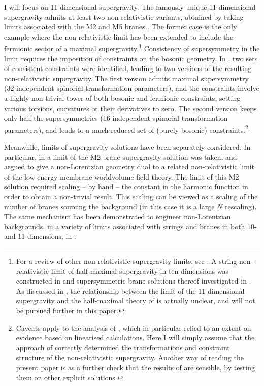 \documentclass[11pt]{article}
\numberwithin{equation}{section}
\begin{document}
I will focus on 11-dimensional supergravity.
The famously unique 11-dimensional supergravity admits at least two non-relativistic variants, obtained by taking limits associated with the M2 
\cite{Blair:2021waq, Bergshoeff:2024nin} and M5 branes \cite{Bergshoeff:2025grj}.
The former case is the only example where the non-relativistic limit has been extended to include the fermionic sector of a maximal supergravity.\footnote{For a review of other non-relativistic supergravity limits, see \cite{Bergshoeff:2022iyb}. 
A string non-relativistic limit of half-maximal supergravity in ten dimensions was constructed in \cite{Bergshoeff:2021tfn} and supersymmetric brane solutions thereof investigated in \cite{Bergshoeff:2022pzk}.
As discussed in \cite{Bergshoeff:2025grj}, the relationship between the limit of the 11-dimensional supergravity and the half-maximal theory of \cite{Bergshoeff:2021tfn} is actually unclear, and will not be pursued further in this paper.
}
Consistency of supersymmetry in the limit requires the imposition of constraints on the bosonic geometry.
In \cite{Bergshoeff:2024nin}, two sets of consistent constraints were identified, leading to two versions of the resulting non-relativistic supergravity.
The first version admits maximal supersymmetry (32 independent spinorial transformation parameters), and the constraints involve a highly non-trivial tower of both bosonic and fermionic constraints, setting various torsions, curvatures or their derivatives to zero.
The second version keeps only half the supersymmetries (16 independent spinorial transformation parameters), and leads to a much reduced set of (purely bosonic) constraints.\footnote{Caveats apply to the analysis of \cite{Bergshoeff:2024nin}, which in particular relied to an extent on evidence based on linearised calculations. Here I will simply assume that the approach of \cite{Bergshoeff:2024nin} correctly determined the transformations and constraint structure of the non-relativistic supergravity. Another way of reading the present paper is as a further check that the results of \cite{Bergshoeff:2024nin} are sensible, by testing them on other explicit solutions.}

Meanwhile, limits of supergravity solutions have been separately considered.
In particular, in \cite{Lambert:2024uue} a limit of the M2 brane supergravity solution was taken, and argued to give a non-Lorentzian geometry dual to a related non-relativistic limit of the low-energy membrane worldvolume field theory.
The limit of this M2 solution required scaling -- by hand -- the constant in the harmonic function in order to obtain a non-trivial result.
This scaling can be viewed as a scaling of the number of branes sourcing the background (in this case it is a large $N$ rescaling).
The same mechanism has been demonstrated to engineer non-Lorentzian backgrounds, in a variety of limits associated with strings and branes in both 10- and 11-dimensions, in \cite{Avila:2023aey,Lambert:2024uue, Lambert:2024yjk,Fontanella:2024kyl,Fontanella:2024rvn, Blair:2024aqz}.
\end{document}
